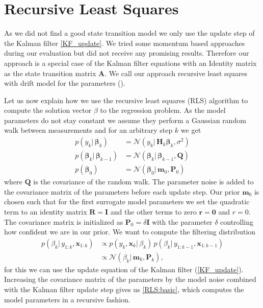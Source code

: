 \section{Recursive Least Squares}
As we did not find a good state transition model
we only use the update step of the Kalman filter \cref{KF_update}.
We tried some momentum based approaches during our evaluation but
did not receive any promising results. 
Therefore our approach is a special case of the Kalman filter
equations with
an Identity matrix as the state transition matrix $\mathbf{A}$.
We call our approach recursive least squares with drift model
for the parameters ().

Let us now explain how we use the recursive least squares (RLS) algorithm
to compute the solution vector $\beta$ to the regression problem.
As the model parameters do not stay constant we assume they perform
a Gaussian random walk between measurements and for an arbitrary
step $k$ we get
\begin{align*}
  p(y_k | \, \mathbf{\beta}_k) &= \mathcal{N}(y_k | \, \mathbf{H}_k \mathbf{\beta}_k, \sigma^2) \\
  p(\mathbf{\beta}_k | \, \mathbf{\beta}_{k-1}) &= \mathcal{N}(\mathbf{\beta}_k | \,
                               \mathbf{\beta}_{k-1}, \mathbf{Q}) \\
  p(\mathbf{\beta}_0) &= \mathcal{N}(\mathbf{\beta}_0 | \, \mathbf{m}_0, \mathbf{P}_0)
\end{align*}
where $\mathbf{Q}$ is the covariance of the random walk.
The parameter noise is added to the covariance matrix of the parameters
before each update step.
Our prior $\mathbf{m}_0$ is chosen such that for the
first surrogate model parameters
we set the quadratic term to an identity matrix $\mathbf{R} = \mathbf{I}$
and the other terms to zero $ \mathbf{r} = \mathbf{0}$ and $ r = 0$.
The covariance matrix is initialized as
$\mathbf{P}_0 = \delta \mathbf{I}$ with
the parameter $\delta$ controlling how confident
we are in our prior.
We want to compute the filtering distribution
\begin{align*}
  p(\beta_k | \, y_{1:k}, \mathbf{x}_{1:k})
  &\propto p(y_k, \mathbf{x}_k | \, \beta_k) \,
    p(\beta_k |\, y_{1:k-1}, \mathbf{x}_{1:k-1}) \\
  &\propto \mathcal{N}(\beta_k | \, \mathbf{m}_k, \mathbf{P}_k), 
\end{align*}
for this we can use the update equation
of the Kalman filter (\ref{KF_update}).
Increasing the covariance matrix of the parameters
by the model noise combined with
the Kalman filter update step
gives us \cref{RLS:basic},
which computes the model parameters in a recursive fashion.


